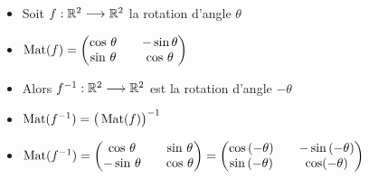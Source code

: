 \begin{frame}

\begin{exemple}
\begin{itemize}[<+->]\setlength{\itemsep}{8pt}
  \item Soit $f: \mathbb{R}^2 \longrightarrow \mathbb{R}^2$ la rotation d'angle $\theta$
  
  \item $\mathop{\text{Mat}}\nolimits(f) = 
\begin{pmatrix}
\cos\, \theta & & -\sin \theta\\
\sin\, \theta &&\cos\, \theta  
\end{pmatrix}$
  
  \item Alors $f^{-1}: \mathbb{R}^2 \longrightarrow \mathbb{R}^2$ est la rotation d'angle $-\theta$
  
  \item $\mathop{\text{Mat}}\nolimits(f^{-1}) = \big(\mathop{\text{Mat}}\nolimits (f) \big)^{-1}$

  \item $\mathop{\text{Mat}}\nolimits(f^{-1}) = \begin{pmatrix}
\cos\, \theta &&\sin \,\theta\\
-\sin\, \theta && \cos\,\theta    
\end{pmatrix}
= \begin{pmatrix}
\cos\, (-\theta ) && -\sin\, (-\theta )\\
\sin\, (-\theta ) && \cos (-\theta )    
  \end{pmatrix}
$
\end{itemize}
\end{exemple}

\end{frame}


